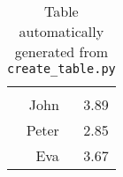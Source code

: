 \begin{xltabular}{0.5\linewidth}{RR}
\caption{Table automatically generated from \texttt{create\_table.py}}\label{tab:test-table}\\
\toprule
{} & {}\\
\midrule
\endhead
\midrule
{} \\
\midrule
\endfoot

\bottomrule
\endlastfoot
  John &  3.89 \\
 Peter &  2.85 \\
   Eva &  3.67 \\
\end{xltabular}
